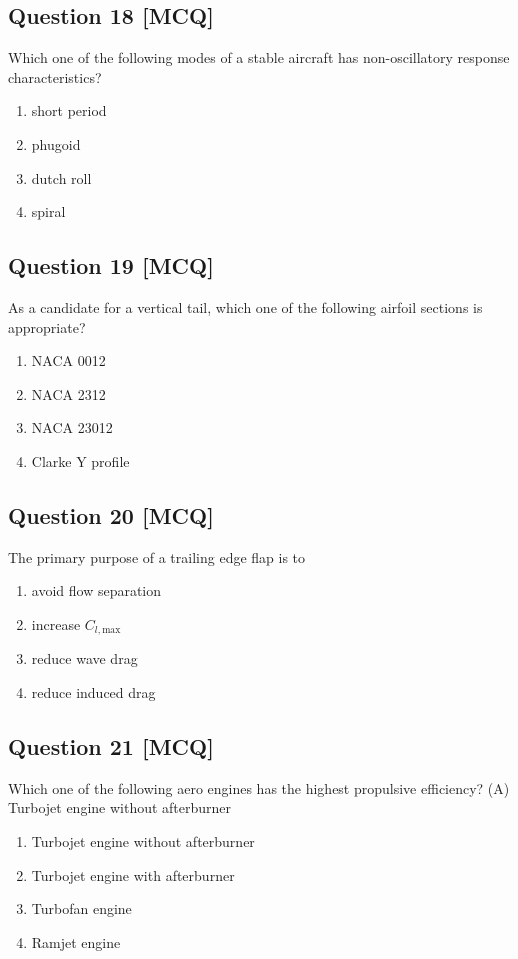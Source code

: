 \documentclass[12pt,a4paper]{article}
\begin{document}
\subsection*{Question 18 [MCQ]}
 Which one of the following modes of a stable aircraft has non-oscillatory response characteristics? 
\begin{enumerate}[label=(\alph*)]
\item short period 
\item phugoid
\item dutch roll 
\item spiral
\end{enumerate}



\subsection*{Question 19 [MCQ]}
  As a candidate for a vertical tail, which one of the following airfoil sections is appropriate? 
\begin{enumerate}[label=(\alph*)]
\item NACA 0012 
\item NACA 2312 
\item NACA 23012
\item Clarke Y profile
\end{enumerate}



\subsection*{Question 20 [MCQ]}
 The primary purpose of a trailing edge flap is to 
\begin{enumerate}[label=(\alph*)]
\item  avoid flow separation
\item  increase \(C_{l ,\text{max}}\)
\item  reduce wave drag 
\item  reduce induced drag
\end{enumerate}



\subsection*{Question 21 [MCQ]}
 Which one of the following aero engines has the highest propulsive efficiency? (A) Turbojet engine without afterburner 
\begin{enumerate}[label=(\alph*)]
\item Turbojet engine without afterburner 
\item Turbojet engine with afterburner 
\item Turbofan engine
\item Ramjet engine 
\end{enumerate}
\end{document}
